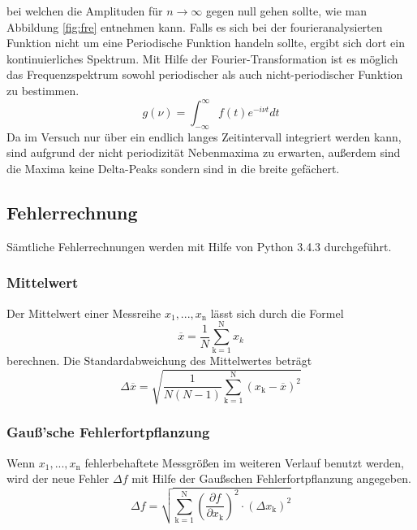 bei welchen die Amplituden für $n \rightarrow \infty$ gegen null gehen sollte, wie man Abbildung \ref{fig:fre} entnehmen kann. Falls es sich bei der fourieranalysierten Funktion nicht um eine Periodische Funktion handeln sollte, ergibt sich dort ein kontinuierliches Spektrum.
Mit Hilfe der Fourier-Transformation ist es möglich das Frequenzspektrum sowohl periodischer als auch nicht-periodischer Funktion zu bestimmen.
\begin{equation}
  g(\nu) = \int^{\infty}_{- \infty} f(t) e^{-i \nu t} dt
  \label{eqn:four-trafo}
\end{equation}
Da im Versuch nur über ein endlich langes Zeitintervall integriert werden kann, sind aufgrund der nicht periodizität Nebenmaxima zu erwarten, außerdem sind die Maxima keine Delta-Peaks sondern sind in die breite gefächert.
\subsection{Fehlerrechnung}
Sämtliche Fehlerrechnungen werden mit Hilfe von Python 3.4.3 durchgeführt.
\subsubsection{Mittelwert}
Der Mittelwert einer Messreihe $x_\text{1}, ... ,x_\text{n}$ lässt sich durch die Formel
\begin{equation}
	\overline{x} = \frac{1}{N} \sum_{\text{k}=1}^\text{N} x_k
	\label{eqn:ave}
\end{equation}
berechnen. Die Standardabweichung des Mittelwertes beträgt
\begin{equation}
	\Delta \overline{x} = \sqrt{ \frac{1}{N(N-1)} \sum_{\text{k}=1}^\text{N} (x_\text{k} - \overline{x})^2}
	\label{eqn:std}
\end{equation}

\subsubsection{Gauß'sche Fehlerfortpflanzung}
Wenn $x_\text{1}, ..., x_\text{n}$ fehlerbehaftete Messgrößen im weiteren Verlauf benutzt werden, wird der neue Fehler $\Delta f$ mit Hilfe der Gaußschen Fehlerfortpflanzung angegeben.
\begin{equation}
	\Delta f = \sqrt{\sum_{\text{k}=1}^\text{N} \left( \frac{ \partial f}{\partial x_\text{k}} \right) ^2 \cdot (\Delta x_\text{k})^2}
	\label{eqn:var}
\end{equation}

